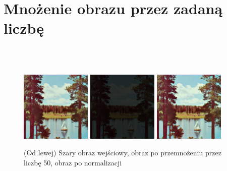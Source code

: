 \documentclass[final,a4paper,openany,12pt]{mwbk}
\begin{document}
\section {Mnożenie obrazu przez zadaną liczbę}
\hfill
\\\\
\indent

\begin{figure}[H]
	\begin{center}
		\includegraphics[width=0.3\textwidth]{1/1Color_Const_Multipl_Original}
		\includegraphics[width=0.3\textwidth]{1/1Color_Const_Multipl_Result}
		\includegraphics[width=0.3\textwidth]{1/1Color_Const_Multipl_Result_Norm}
	\end{center}
	\caption{(Od lewej) Szary obraz wejściowy, obraz po przemnożeniu przez liczbę 50, obraz po normalizacji }
\end{figure}
\end{document}
